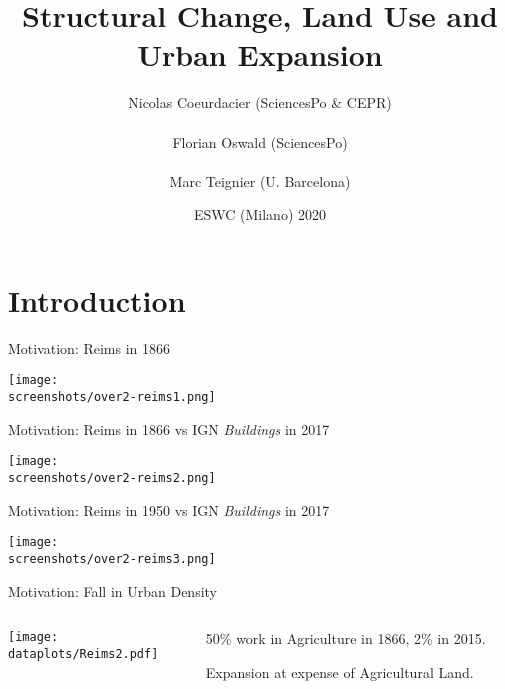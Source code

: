 \documentclass[aspectratio=169]{beamer}
\begin{document}
\title{\textbf{Structural Change, Land Use and Urban Expansion}}
\author{Nicolas Coeurdacier (SciencesPo \& CEPR)\\ \ \\Florian Oswald (SciencesPo) \\ \ \\ Marc Teignier (U. Barcelona)}
\date{ESWC (Milano) 2020}


\frame{\titlepage}



\section{Introduction}

\begin{frame}{Motivation: Reims in 1866}
\begin{adjustbox}{center}
\texttt{[image: \\screenshots/over2-reims1.png]}\end{adjustbox}
\end{frame}

\begin{frame}{Motivation: Reims in 1866 vs IGN \emph{Buildings} in 2017}
\begin{adjustbox}{center}
\texttt{[image: \\screenshots/over2-reims2.png]}\end{adjustbox}
\end{frame}

\begin{frame}{Motivation: Reims in 1950 vs IGN \emph{Buildings} in 2017}
\begin{adjustbox}{center}
\texttt{[image: \\screenshots/over2-reims3.png]}\end{adjustbox}
\end{frame}

\begin{frame}{Motivation: Fall in Urban Density}
\begin{columns}
\begin{column}{0.7\textwidth}
\texttt{[image: \\dataplots/Reims2.pdf]}
\end{column}
\begin{column}{0.3\textwidth}
\begin{midi}
\item 50\% work in Agriculture in 1866, 2\% in 2015.
\item Expansion at expense of Agricultural Land.
\end{midi}

\end{column}
\end{columns}
\end{frame}
\end{document}
